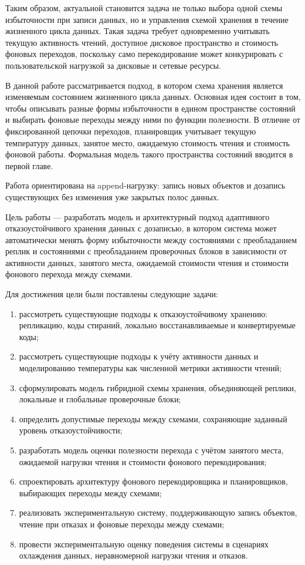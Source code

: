 Таким образом, актуальной становится задача не только выбора одной схемы
избыточности при записи данных, но и управления схемой хранения в течение
жизненного цикла данных. Такая задача требует одновременно учитывать текущую
активность чтений, доступное дисковое пространство и стоимость фоновых
переходов, поскольку само перекодирование может конкурировать с
пользовательской нагрузкой за дисковые и сетевые ресурсы.

В данной работе рассматривается подход, в котором схема хранения является
изменяемым состоянием жизненного цикла данных. Основная идея состоит в том,
чтобы описывать разные формы избыточности в едином пространстве состояний и
выбирать фоновые переходы между ними по функции полезности. В отличие от
фиксированной цепочки переходов, планировщик учитывает текущую температуру
данных, занятое место, ожидаемую стоимость чтения и стоимость фоновой работы.
Формальная модель такого пространства состояний вводится в первой главе.

Работа ориентирована на append-нагрузку: запись новых объектов и дозапись
существующих без изменения уже закрытых полос данных.

Цель работы --- разработать модель и архитектурный подход адаптивного
отказоустойчивого хранения данных с дозаписью, в котором система может
автоматически менять форму избыточности между состояниями с преобладанием
реплик и состояниями с преобладанием проверочных блоков в зависимости от
активности данных, занятого места, ожидаемой стоимости чтения и стоимости
фонового перехода между схемами.

Для достижения цели были поставлены следующие задачи:
\begin{enumerate}
    \item рассмотреть существующие подходы к отказоустойчивому хранению:
    репликацию, коды стираний, локально восстанавливаемые и конвертируемые
    коды;
    \item рассмотреть существующие подходы к учёту активности данных и
    моделированию температуры как численной метрики активности чтений;
    \item сформулировать модель гибридной схемы хранения, объединяющей
    реплики, локальные и глобальные проверочные блоки;
    \item определить допустимые переходы между схемами, сохраняющие заданный
    уровень отказоустойчивости;
    \item разработать модель оценки полезности перехода с учётом занятого
    места, ожидаемой нагрузки чтения и стоимости фонового перекодирования;
    \item спроектировать архитектуру фонового перекодировщика и планировщиков,
    выбирающих переходы между схемами;
    \item реализовать экспериментальную систему, поддерживающую запись
    объектов, чтение при отказах и фоновые переходы между схемами;
    \item провести экспериментальную оценку поведения системы в сценариях
    охлаждения данных, неравномерной нагрузки чтения и отказов.
\end{enumerate}

